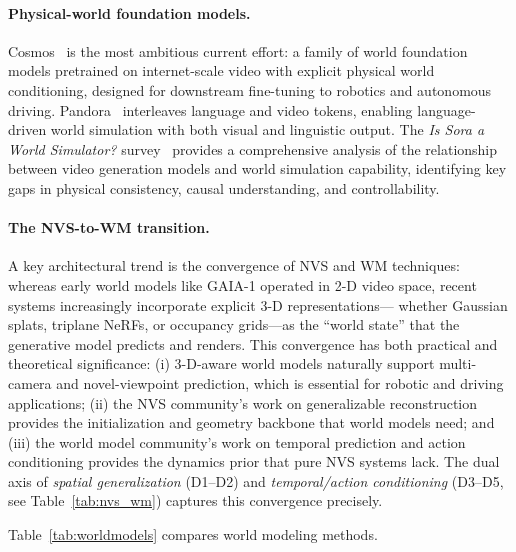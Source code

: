 \paragraph{Physical-world foundation models.}
Cosmos~\citep{agarwal2025cosmos} is the most ambitious current effort:
a family of world foundation models pretrained on internet-scale video with
explicit physical world conditioning, designed for downstream fine-tuning
to robotics and autonomous driving.
Pandora~\citep{xiang2024pandora} interleaves language and video tokens,
enabling language-driven world simulation with both visual and linguistic output.
The \emph{Is Sora a World Simulator?} survey~\citep{zhu2024sora_survey}
provides a comprehensive analysis of the relationship between video generation
models and world simulation capability, identifying key gaps in physical
consistency, causal understanding, and controllability.

\paragraph{The NVS-to-WM transition.}
A key architectural trend is the convergence of NVS and WM techniques:
whereas early world models like GAIA-1 operated in 2-D video space,
recent systems increasingly incorporate explicit 3-D representations---
whether Gaussian splats, triplane NeRFs, or occupancy grids---as the
``world state'' that the generative model predicts and renders.
This convergence has both practical and theoretical significance:
(i) 3-D-aware world models naturally support multi-camera and novel-viewpoint
prediction, which is essential for robotic and driving applications;
(ii) the NVS community's work on generalizable reconstruction provides the
initialization and geometry backbone that world models need;
and (iii) the world model community's work on temporal prediction and
action conditioning provides the dynamics prior that pure NVS systems lack.
The dual axis of \emph{spatial generalization} (D1--D2) and
\emph{temporal/action conditioning} (D3--D5, see Table~\ref{tab:nvs_wm})
captures this convergence precisely.

Table~\ref{tab:worldmodels} compares world modeling methods.

